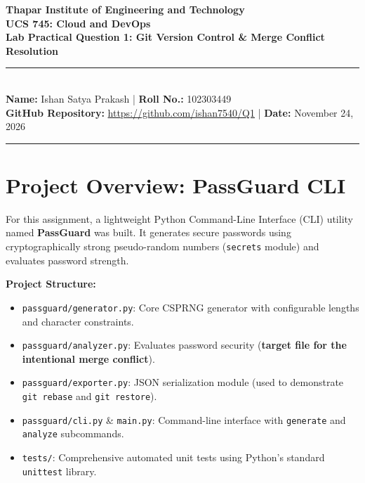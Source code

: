 \documentclass[11pt,a4paper]{article}
\begin{document}
\begin{center}
    {\LARGE \textbf{Thapar Institute of Engineering and Technology}}\\[0.25cm]
    {\large \textbf{UCS 745: Cloud and DevOps}}\\[0.35cm]
    {\Large \textbf{Lab Practical Question 1: Git Version Control \& Merge Conflict Resolution}}\\[0.35cm]
    \rule{\textwidth}{0.8pt}\\[0.25cm]
    \textbf{Name:} Ishan Satya Prakash \quad | \quad \textbf{Roll No.:} 102303449\\[0.15cm]
    \textbf{GitHub Repository:} \url{https://github.com/ishan7540/Q1} \quad | \quad \textbf{Date:} November 24, 2026\\[0.15cm]
    \rule{\textwidth}{0.8pt}
\end{center}

\vspace{0.1cm}

\section{Project Overview: PassGuard CLI}
For this assignment, a lightweight Python Command-Line Interface (CLI) utility named \textbf{PassGuard} was built. It generates secure passwords using cryptographically strong pseudo-random numbers (\texttt{secrets} module) and evaluates password strength.

\textbf{Project Structure:}
\begin{itemize}
    \item \texttt{passguard/generator.py}: Core CSPRNG generator with configurable lengths and character constraints.
    \item \texttt{passguard/analyzer.py}: Evaluates password security (\textbf{target file for the intentional merge conflict}).
    \item \texttt{passguard/exporter.py}: JSON serialization module (used to demonstrate \texttt{git rebase} and \texttt{git restore}).
    \item \texttt{passguard/cli.py} \& \texttt{main.py}: Command-line interface with \texttt{generate} and \texttt{analyze} subcommands.
    \item \texttt{tests/}: Comprehensive automated unit tests using Python's standard \texttt{unittest} library.
\end{itemize}
\end{document}
